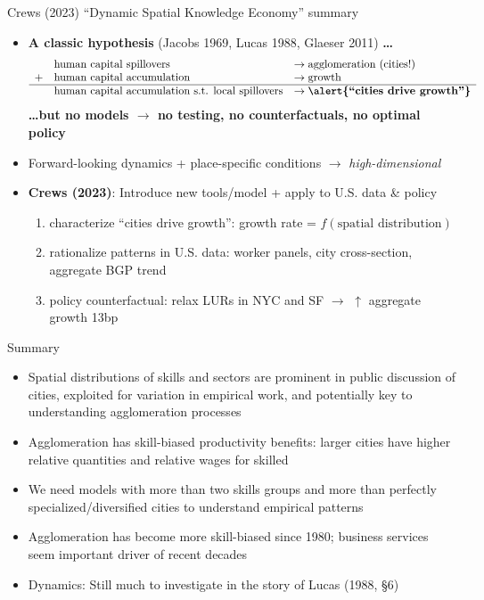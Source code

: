 \documentclass[11pt,notes=hide,aspectratio=169]{beamer}
\begin{document}
\begin{frame}{Crews (2023) ``Dynamic Spatial Knowledge Economy'' summary}
    \label{frame:conclusion}
    \begin{itemize}
        \setlength\itemsep{3mm}
        \item \textbf{A classic hypothesis} {\footnotesize (Jacobs 1969, Lucas 1988, Glaeser 2011)} \textbf{\ldots}
        \begin{equation*}
            \begin{array}{cll}
                & \text{human capital spillovers} & \to \text{agglomeration (cities!)} \\
                + & \text{human capital accumulation} & \to \text{growth} \\ \hline
                & \text{human capital accumulation s.t. local spillovers} & \to \text{\textbf{\alert{``cities drive growth''}}}
            \end{array}
        \end{equation*}
        \textbf{\ldots but no models $\to$ no testing, no counterfactuals, no optimal policy}
        \item Forward-looking dynamics + place-specific conditions $\to$ \textit{high-dimensional}
        \item \textbf{Crews (2023)}: Introduce new tools/model + apply to U.S. data \& policy
        \begin{enumerate}
            \item characterize ``cities drive growth'': growth rate = $f(\text{spatial distribution})$
            \item rationalize patterns in U.S. data: worker panels, city cross-section, aggregate BGP trend
            \item policy counterfactual: relax LURs in NYC and SF $\to$ $\uparrow$ aggregate growth 13bp
        \end{enumerate}
    \end{itemize}
\end{frame}
\begin{frame}{Summary}
\begin{itemize}
	\item Spatial distributions of skills and sectors are prominent in public discussion of cities, exploited for variation in empirical work, and potentially key to understanding agglomeration processes
	\item Agglomeration has skill-biased productivity benefits:
	larger cities have higher relative quantities and relative wages for skilled
	\item We need models with more than two skills groups and more than perfectly specialized/diversified cities to understand empirical patterns
	\item Agglomeration has become more skill-biased since 1980; business services seem important driver of recent decades
	\item Dynamics: Still much to investigate in the story of Lucas (1988, \S 6)
\end{itemize}
\end{frame}
\end{document}
